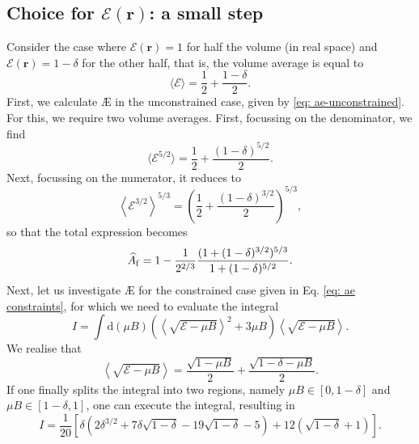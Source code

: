 \subsection{Choice for $\mathcal{E}(\boldsymbol{r})$: a small step}
Consider the case where $\mathcal{E}(\boldsymbol{r})=1$ for half the volume (in real space) and $\mathcal{E}(\boldsymbol{r})=1 - \delta$ for the other half, that is, the volume average is equal to
\begin{equation}
    \langle \mathcal{E} \rangle = \frac{1}{2} + \frac{1 - \delta }{2}.
\end{equation}
First, we calculate \AE{} in the unconstrained case, given by \eqref{eq: ae-unconstrained}. For this, we require two volume averages. First, focussing on the denominator, we find
\begin{equation}
    \langle \mathcal{E}^{5/2} \rangle = \frac{1}{2} + \frac{(1-\delta)^{5/2}}{2}.
\end{equation}
Next, focussing on the numerator, it reduces to
\begin{equation}
    \left\langle \mathcal{E}^{3/2} \right\rangle^{5/3} = \left( \frac{1}{2} + \frac{(1 - \delta)^{3/2}}{2} \right)^{5/3},
\end{equation}
so that the total expression becomes
\begin{equation}
    \widehat{A}_{\rm f} = 1 - \frac{1}{2^{2/3}} \frac{(1 + (1 - \delta)^{3/2})^{5/3}}{1+(1-\delta)^{5/2}}.
\end{equation}
Next, let us investigate \AE{} for the constrained case given in Eq. \eqref{eq: ae constraints}, for which we need to evaluate the integral
\begin{equation}
    I=\int \mathrm{d}(\mu B) \left(\left\langle \sqrt{ \mathcal{E} - \mu B} \right\rangle^2 + 3 \mu B \right) \left\langle \sqrt{ \mathcal{E} - \mu B} \right\rangle.
\end{equation}
We realise that
\begin{equation}
    \left\langle \sqrt{ \mathcal{E} - \mu B} \right\rangle = \frac{\sqrt{1 - \mu B}}{2} + \frac{\sqrt{1-\delta - \mu B}}{2}.
\end{equation}
If one finally splits the integral into two regions, namely $\mu B \in [0,1-\delta] $ and $\mu B \in [1- \delta,1]$, one can execute the integral, resulting in
\begin{equation}
    I=\frac{1}{20} \left[\delta  \left(2 \delta ^{3/2}+7\delta \sqrt{1-\delta }  -19
   \sqrt{1-\delta }-5\right)+12 \left(\sqrt{1-\delta }+1\right)\right].
\end{equation}
